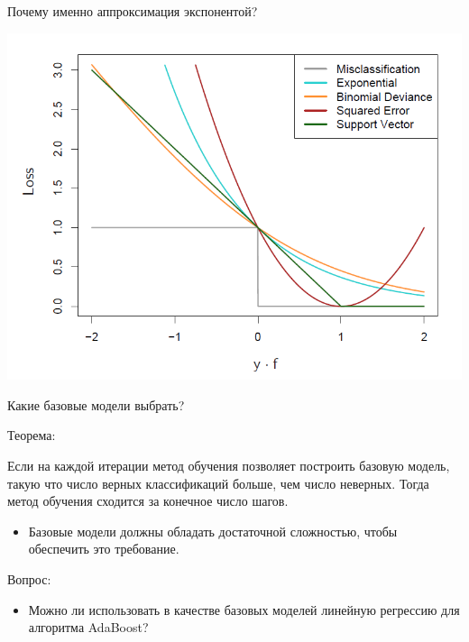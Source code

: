 \documentclass[10pt]{beamer}
\begin{document}
\begin{frame}{Почему именно аппроксимация экспонентой?}
\begin{center}
    \includegraphics[scale=0.3]{images/exploss.png}
\end{center}
\end{frame}

\begin{frame}{Какие базовые модели выбрать?}
\begin{block}{Теорема:}
\end{block}
Если на каждой итерации метод обучения позволяет построить базовую модель,
такую что число верных классификаций больше, чем число неверных. Тогда метод
обучения сходится за конечное число шагов.

\vspace{1em}
\begin{itemize}
    \item Базовые модели должны обладать достаточной сложностью, чтобы
        обеспечить это требование.
\end{itemize}

\vspace{1em}
\begin{block}{Вопрос:}
\end{block}
\begin{itemize}
    \item Можно ли использовать в качестве базовых моделей линейную регрессию
        для алгоритма AdaBoost?
\end{itemize}
\end{frame}
\end{document}
